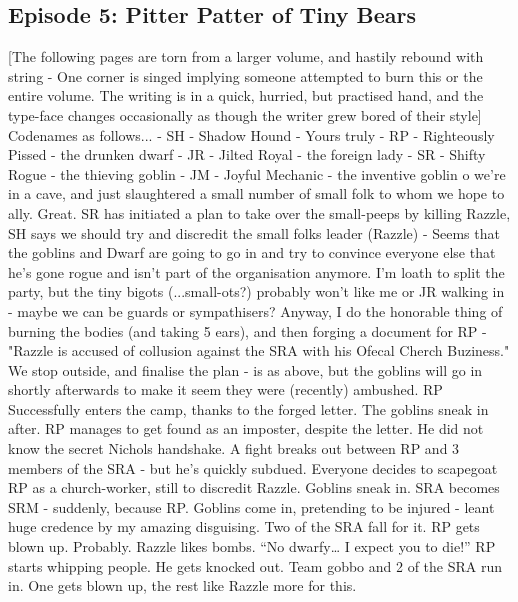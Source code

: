\subsection{Episode 5: Pitter Patter of Tiny Bears}

[The following pages are torn from a larger volume, and hastily rebound with string - One corner is singed implying someone attempted to burn this or the entire volume.\medskip
The writing is in a quick, hurried, but practised hand, and the type-face changes occasionally as though the writer grew bored of their style]\medskip
Codenames as follows...\medskip
- SH - Shadow Hound - Yours truly\medskip
- RP - Righteously Pissed - the drunken dwarf\medskip
- JR - Jilted Royal - the foreign lady\medskip
- SR - Shifty Rogue - the thieving goblin\medskip
- JM - Joyful Mechanic - the inventive goblin\medskip
{}o we’re in a cave, and just slaughtered a small number of small folk to whom we hope to ally. Great.
SR has initiated a plan to take over the small-peeps by killing Razzle, SH says we should try and discredit the small folks leader (Razzle) - Seems that the goblins and Dwarf are going to go in and try to convince everyone else that he’s gone rogue and isn’t part of the organisation anymore.\medskip
I’m loath to split the party, but the tiny bigots (...small-ots?) probably won’t like me or JR walking in - maybe we can be guards or sympathisers?\medskip
Anyway, I do the honorable thing of burning the bodies (and taking 5 ears), and then forging a document for RP -
"Razzle is accused of collusion against the SRA with his Ofecal Cherch Buziness."\medskip
We stop outside, and finalise the plan - is as above, but the goblins will go in shortly afterwards to make it seem they were (recently) ambushed.\medskip
RP Successfully enters the camp, thanks to the forged letter. The goblins sneak in after. RP manages to get found as an imposter, despite the letter. He did not know the secret Nichols handshake.\medskip
A fight breaks out between RP and 3 members of the SRA - but he’s quickly subdued.\medskip
Everyone decides to scapegoat RP as a church-worker, still to discredit Razzle. Goblins sneak in.\medskip
SRA becomes SRM - suddenly, because RP.\medskip
Goblins come in, pretending to be injured - leant huge credence by my amazing disguising. Two of the SRA fall for it.\medskip
RP gets blown up. Probably. Razzle likes bombs. “No dwarfy… I expect you to die!”\medskip
RP starts whipping people. He gets knocked out.\medskip
Team gobbo and 2 of the SRA run in. One gets blown up, the rest like Razzle more for this.\medskip
